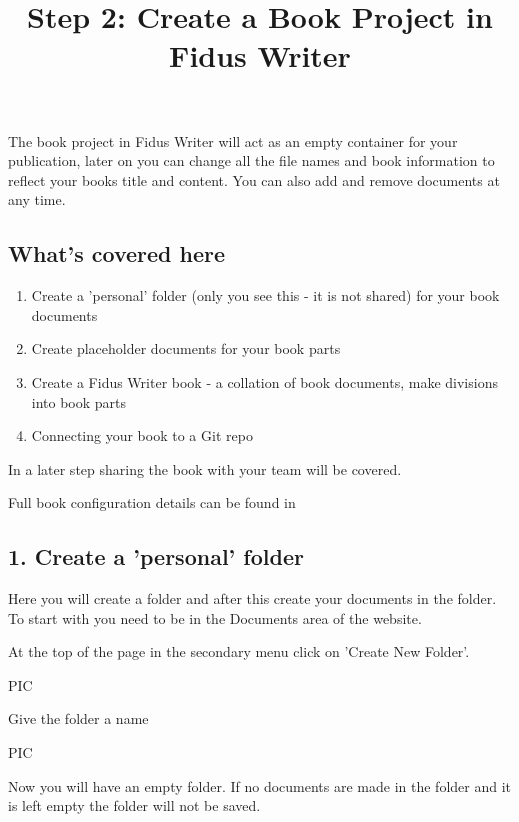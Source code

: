 \documentclass{article}
\begin{document}
\title{Step 2: Create a Book Project in Fidus Writer}

\maketitle


The book project in Fidus Writer will act as an empty container for your publication, later on you can change all the file names and book information to reflect your books title and content. You can also add and remove documents at any time.


\subsection{What's covered here}\label{H4535132}


\begin{enumerate}
\item Create a 'personal' folder (only you see this - it is not shared) for your book documents


\item Create placeholder documents for your book parts


\item Create a Fidus Writer book - a collation of book documents, make divisions into book parts 


\item Connecting your book to a Git repo  


\end{enumerate}

In a later step sharing the book with your team will be covered.


Full book configuration details can be found in 


\subsection{1. Create a 'personal' folder}\label{H4439255}



Here you will create a folder and after this create your documents in the folder. To start with you need to be in the Documents area of the website. 


At the top of the page in the secondary menu click on 'Create New Folder'.


PIC


Give the folder a name


PIC


Now you will have an empty folder. If no documents are made in the folder and it is left empty the folder will not be saved.
\end{document}
